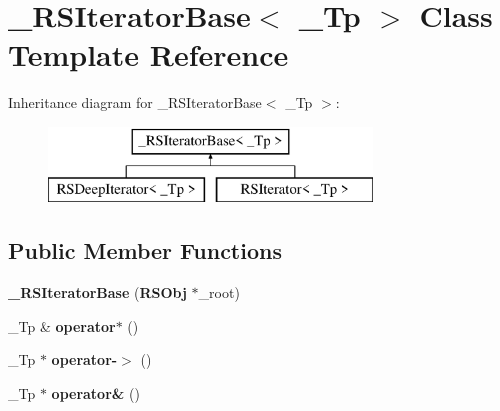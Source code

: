 \section{\-\_\-\-R\-S\-Iterator\-Base$<$ \-\_\-\-Tp $>$ Class Template Reference}
\label{class__RSIteratorBase}
Inheritance diagram for \-\_\-\-R\-S\-Iterator\-Base$<$ \-\_\-\-Tp $>$\-:\begin{figure}[H]
\begin{center}
\leavevmode
\includegraphics[height=2.000000cm]{class__RSIteratorBase}
\end{center}
\end{figure}
\subsection*{Public Member Functions}
\begin{DoxyCompactItemize}
\item 
{\bfseries \-\_\-\-R\-S\-Iterator\-Base} ({\bf R\-S\-Obj} $\ast$\-\_\-root)\label{class__RSIteratorBase_af07a7397181c549e9dccda2f1ed00ffa}

\item 
\-\_\-\-Tp \& {\bfseries operator$\ast$} ()\label{class__RSIteratorBase_ab2c8eb9b01dca6f47d8229cb797b6ead}

\item 
\-\_\-\-Tp $\ast$ {\bfseries operator-\/$>$} ()\label{class__RSIteratorBase_a84c8d55b3d349d466c7b3113e8a5fc18}

\item 
\-\_\-\-Tp $\ast$ {\bfseries operator\&} ()\label{class__RSIteratorBase_ae17fe20d0ec34ab179549c172986c740}

\end{DoxyCompactItemize}

